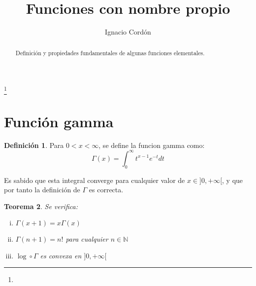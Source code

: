 \documentclass[a4paper, 11pt]{amsart}
\newtheorem{theorem}{Teorema}[section]
\theoremstyle{definition}
\newtheorem{definition}[theorem]{Definición}
\theoremstyle{remark}
\numberwithin{equation}{section}
\begin{document}
\title{Funciones con nombre propio}


\author{Ignacio Cordón}
\address{}
\curraddr{}
\email{}
\thanks{}


\keywords{}

\date{}

\dedicatory{}


\begin{abstract}
  Definición y propiedades fundamentales de algunas funciones elementales.
\end{abstract}

\maketitle

  \section{Función gamma}
  
  \begin{definition}
  Para $0 < x < \infty$, se define la funcion gamma como: 
    \begin{equation}
      \Gamma(x) = \int_0^{\infty}{t^{x-1}e^{-t}dt}
      \label{gamma}
    \end{equation}
  \end{definition}
  
  Es sabido que esta integral converge para cualquier valor de $x\in]0,+\infty[$, y que por tanto la definición de 
  $\Gamma$ es correcta.\\
  
  \begin{theorem}
    Se verifica:
      \begin{enumerate}[i.]
	\item $\Gamma(x+1) = x\Gamma(x)$
	\item $\Gamma(n+1) = n!$ para cualquier $n\in \mathbb{N}$
	\item $\log \circ \Gamma$ es convexa en $]0,+\infty[$
      \end{enumerate}
  \end{theorem}
  
\end{document}
